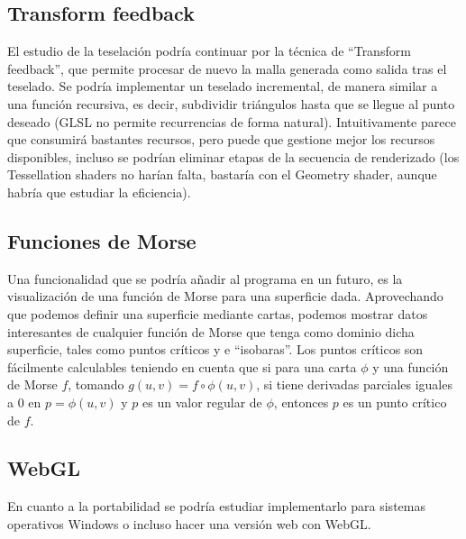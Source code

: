 \subsection*{Transform feedback}
El estudio de la teselación podría continuar por la técnica de ``Transform feedback'', que permite procesar de nuevo la malla generada como salida tras el teselado. Se podría implementar un teselado incremental, de manera similar a una función recursiva, es decir, subdividir triángulos hasta que se llegue al punto deseado (GLSL no permite recurrencias de forma natural). Intuitivamente parece que consumirá bastantes recursos, pero puede que gestione mejor los recursos disponibles, incluso se podrían eliminar etapas de la secuencia de renderizado (los Tessellation shaders no harían falta, bastaría con el Geometry shader, aunque habría que estudiar la eficiencia).\\

\subsection*{Funciones de Morse}
Una funcionalidad que se podría añadir al programa en un futuro, es la visualización de una función de Morse para una superficie dada. Aprovechando que podemos definir una superficie mediante cartas, podemos mostrar datos interesantes de cualquier función de Morse que tenga como dominio dicha superficie, tales como puntos críticos y e ``isobaras''. Los puntos críticos son fácilmente calculables teniendo en cuenta que si para una carta $\phi$ y una función de Morse $f$, tomando $g(u,v)=f \circ \phi (u,v)$, si tiene derivadas parciales iguales a $0$ en $p=\phi(u,v)$ y $p$ es un valor regular de $\phi$, entonces $p$ es un punto crítico de $f$.\\

\subsection*{WebGL}
En cuanto a la portabilidad se podría estudiar implementarlo para sistemas operativos Windows o incluso hacer una versión web con WebGL.\\

